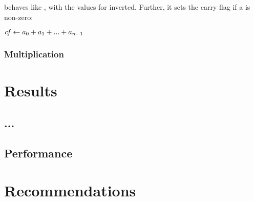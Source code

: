 \documentclass[a4paper,11pt]{kth-mag}
\renewcommand{\gets}{\leftarrow}
\begin{document}
 behaves like , with the values for  inverted.
Further, it sets the carry flag if a is non-zero:

\begin{codebox}
\zi $\id{cf} \gets a_0 + a_1 + ... + a_{n-1}$
\end{codebox}

\subsection{Multiplication}

\chapter{Results}
\label{ch:results}

\section{...}


\section{Performance}

\chapter{Recommendations}
\label{ch:recommendations}



\end{document}
